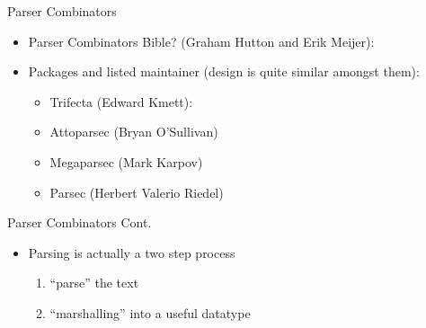 \documentclass[hyperref={pdfpagelabels=false},12pt]{beamer}
\newcommand{\unnamedUrl}[1]{\href{#1}{\color{blue}{#1}}}
\begin{document}
\begin{frame}{Parser Combinators}
  \begin{itemize}
    \item Parser Combinators Bible? (Graham Hutton and Erik Meijer): \unnamedUrl{http://www.cs.nott.ac.uk/~pszgmh/monparsing.pdf}
    \item Packages and listed maintainer (design is quite similar amongst them):
    \begin{itemize}
      \item Trifecta (Edward Kmett): \unnamedUrl{https://hackage.haskell.org/package/trifecta}
      \item Attoparsec (Bryan O'Sullivan) \unnamedUrl{http://hackage.haskell.org/package/attoparsec}
      \item Megaparsec (Mark Karpov) \unnamedUrl{http://hackage.haskell.org/package/megaparsec}
      \item Parsec (Herbert Valerio Riedel) \unnamedUrl{http://hackage.haskell.org/package/parsec}
    \end{itemize}
  \end{itemize}
\end{frame}

\begin{frame}{Parser Combinators Cont.}
  \begin{itemize}
    \item Parsing is actually a two step process
    \begin{enumerate}
      \item ``parse'' the text
      \item ``marshalling'' into a useful datatype
    \end{enumerate}
  \end{itemize}
\end{frame}
\end{document}
